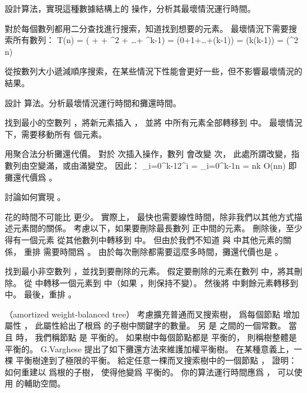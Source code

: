 \startigBase[a]
\startitem
設計算法，實現這種數據結構上的  操作，分析其最壞情況運行時間。
\stopitem

\startANSWER
對於每個數列都用二分查找進行搜索，知道找到想要的元素。
最壞情況下需要搜索所有數列：
\startformula\startmathalignment
\NC T(n) \NC = \Theta( +  + ^2 + \ldots + ^{k-1}) \NR
\NC \NC = \Theta(0+1+\ldots+(k-1)) \NR
\NC \NC = \Theta(k(k-1)) \NR
\NC \NC = \Theta(\lg^2 n) \NR
\stopmathalignment\stopformula

從按數列大小遞減順序搜索，在某些情況下性能會更好一些，但不影響最壞情況的結果。
\stopANSWER

\startitem
設計  算法。分析最壞情況運行時間和攤還時間。
\stopitem

\startANSWER
找到最小的空數列 ，將新元素插入 ，
並將  中所有元素全部轉移到  中。
最壞情況下，需要移動所有  個元素。

用聚合法分析攤還代價。
對於  次插入操作，數列  會改變  次，
此處所謂改變，指數列由空變滿，或由滿變空。
因此：
\startformula
\sum_{i=0}^{k-1}2^i = \sum_{i=0}^{k-1}n = nk \in O(n\lg n)
\stopformula
即攤還代價爲 。
\stopANSWER

\startitem
討論如何實現 。
\stopitem

\startANSWER
{} 花的時間不可能比  更少。
實際上，  最快也需要線性時間，除非我們以其他方式描述元素間的關係。
考慮以下，如果要刪除最長數列  正中間的元素。
刪除後，至少得有一個元素  從其他數列中轉移到  中。
但由於我們不知道  與  中其他元素的關係，
重排  需要時間爲 。
由於每次刪除都需要這麼多時間，攤還代價也是 。

找到最小非空數列 ，並找到要刪除的元素。
假定要刪除的元素在數列  中，將其刪除。
從  中轉移一個元素到  中（如果 ，則保持不變）。
然後將  中剩餘元素轉移到  中。
最後，重排 。
\stopANSWER
\stopigBase
\stopPROBLEM

\startPROBLEM
（amortized weight-balanced tree）
考慮擴充普通而叉搜索樹，
爲每個節點  增加屬性 ，
此屬性給出了根爲  的子樹中關鍵字的數量。
另 \m{\alpha} 是  之間的一個常數。
當  且  時，
我們稱節點  是 {\EMP \m{\alpha} 平衡的}。
如果樹中每個節點都是 \m{\alpha} 平衡的，
則稱樹整體是 {\EMP \m{\alpha} 平衡的}。
 G.Varghese 提出了如下攤還方法來維護加權平衡樹。
\startigBase[a]\startitem
在某種意義上，一棵  平衡樹達到了極限的平衡。
給定任意一棵而叉搜索樹中的一個節點 ，
證明：如何重建以  爲根的子樹，
使得他變爲  平衡的。
你的算法運行時間應爲 ，
可以使用  的輔助空間。
\stopitem\stopigBase

